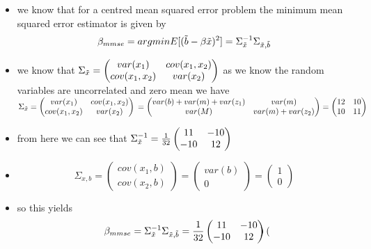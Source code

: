 \documentclass[12pt,twoside]{article}
\begin{document}
\begin{enumerate}
\begin{enumerate}
\begin{itemize}
    \color{blue}
    \item we know that for a centred mean squared error problem the minimum mean squared error estimator is given by $$\beta_{mmse}=argminE[(\Tilde{b}-\beta \Tilde{x})^2]=\Sigma_{\Tilde{x}}^{-1}\Sigma_{\Tilde{x}, \Tilde{b}}$$
    \item we know that $\Sigma_{\Tilde{x}}=\begin{pmatrix}
        var(x_1) & cov(x_1,x_2) \\ cov(x_1,x_2) & var(x_2)
    \end{pmatrix}$ as we know the random variables are uncorrelated and zero mean we have  $\Sigma_{\Tilde{x}}=\begin{pmatrix}
        var(x_1) & cov(x_1,x_2) \\ cov(x_1,x_2) & var(x_2)
    \end{pmatrix}\\=\begin{pmatrix}
        var(b)+var(m)+var(z_1) & var(m) \\ var(M) & var(m)+var(z_2)
    \end{pmatrix}=\begin{pmatrix}
        12 & 10 \\ 10 & 11
    \end{pmatrix}$
    \item from here we can see that $\Sigma_{\Tilde{x}}^{-1}=\frac{1}{32}\begin{pmatrix}
        11 & -10 \\ -10 & 12
    \end{pmatrix}$
    \item $$\Sigma_{x,b}=\begin{pmatrix}
        cov(x_1,b)\\cov(x_2,b)
    \end{pmatrix}=\begin{pmatrix}
        var(b)\\0
    \end{pmatrix}=\begin{pmatrix}
        1\\0
    \end{pmatrix}$$
    \item so this yields $$ \beta_{mmse}=\Sigma_{\Tilde{x}}^{-1}\Sigma_{\Tilde{x}, \Tilde{b}}=\frac{1}{32}\begin{pmatrix}
        11 & -10 \\ -10 & 12
    \end{pmatrix}\begin{pmatrix}

\end{pmatrix}$$
\end{itemize}
\end{enumerate}
\end{enumerate}
\end{document}
